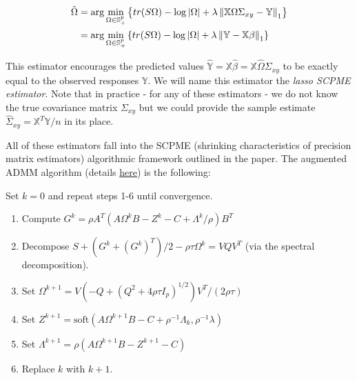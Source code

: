 \documentclass[11pt,]{report}
\begin{document}
\begin{equation}
\begin{split}
\hat{\Omega} &= \arg\min_{\Omega \in \mathbb{S}_{+}^{p}}\left\{ tr(S\Omega) - \log\left| \Omega \right| + \lambda\left\| \mathbb{X}\Omega \Sigma_{xy} - \mathbb{Y} \right\|_{1} \right\} \\
  &= \arg\min_{\Omega \in \mathbb{S}_{+}^{p}}\left\{ tr(S\Omega) - \log\left| \Omega \right| + \lambda\left\| \mathbb{Y} - \mathbb{X}\beta \right\|_{1} \right\}
\label{eq:penloglik5}\notag
\end{split}
\end{equation}

This estimator encourages the predicted values \(\hat{\mathbb{Y}} = \mathbb{X}\hat{\beta} = \mathbb{X}\hat{\Omega}\Sigma_{xy}\) to be exactly equal to the observed responses \(\mathbb{Y}\). We will name this estimator the \emph{lasso SCPME estimator}. Note that in practice - for any of these estimators - we do not know the true covariance matrix \(\Sigma_{xy}\) but we could provide the sample estimate \(\hat{\Sigma}_{xy} = \mathbb{X}^{T}\mathbb{Y}/n\) in its place.

All of these estimators fall into the SCPME (shrinking characteristics of precision matrix estimators) algorithmic framework outlined in the paper. The augmented ADMM algorithm (details \href{https://mgallow.github.io/SCPME/articles/Details.html\#augmented-admm-algorithm}{here}) is the following:

Set \(k = 0\) and repeat steps 1-6 until convergence.

\begin{enumerate}
\def\labelenumi{\arabic{enumi}.}
\item
  Compute \(G^{k} = \rho A^{T}\left( A\Omega^{k} B - Z^{k} - C + \Lambda^{k}/\rho \right)B^{T}\)
\item
  Decompose \(S + \left( G^{k} + (G^{k})^{T} \right)/2 - \rho\tau\Omega^{k} = VQV^{T}\) (via the spectral decomposition).
\item
  Set \(\Omega^{k + 1} = V\left( -Q + (Q^{2} + 4\rho\tau I_{p})^{1/2} \right)V^{T}/(2\rho\tau)\)
\item
  Set \(Z^{k + 1} = \mbox{soft}\left( A\Omega^{k + 1}B - C + \rho^{-1}\Lambda_{k}, \rho^{-1}\lambda \right)\)
\item
  Set \(\Lambda^{k + 1} = \rho\left( A\Omega^{k + 1} B - Z^{k + 1} - C \right)\)
\item
  Replace \(k\) with \(k + 1\).
\end{enumerate}
\end{document}
